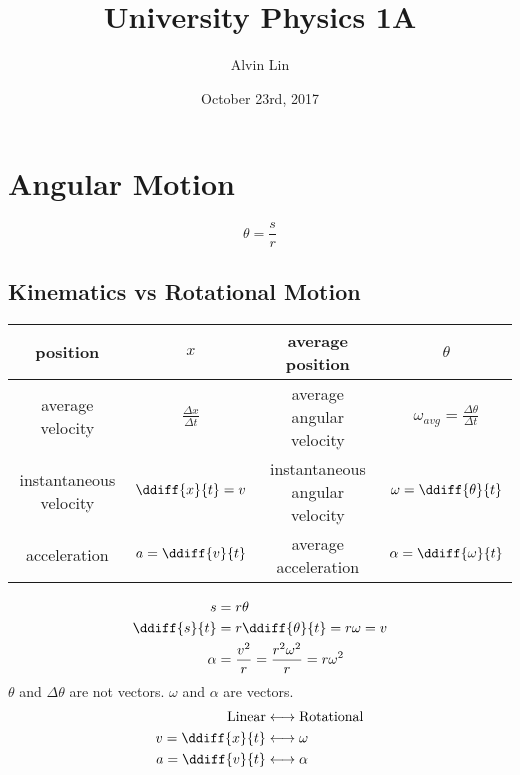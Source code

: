\documentclass{math}
\title{University Physics 1A}
\author{Alvin Lin}
\date{October 23rd, 2017}
\begin{document}
\maketitle

\section*{Angular Motion}

\begin{center}
\end{center}
\[ \theta = \frac{s}{r} \]

\subsection*{Kinematics vs Rotational Motion}
\begin{center}
  \renewcommand{\arraystretch}{1.5}
  \begin{tabular}{|c|c|c|c|}
    \hline
    position & \( x \) & average position & \( \theta \) \\
    \hline
    average velocity & \( \frac{\Delta x}{\Delta t} \) &
      average angular velocity &
      \( \omega_{avg} = \frac{\Delta\theta}{\Delta t} \) \\
    \hline
    instantaneous velocity & \( \ddiff{x}{t} = v \) &
      instantaneous angular velocity & \( \omega = \ddiff{\theta}{t} \) \\
    \hline
    acceleration & \( a = \ddiff{v}{t} \) & average acceleration &
      \( \alpha = \ddiff{\omega}{t} \) \\
    \hline
  \end{tabular}
\end{center}
\begin{align*}
  s &= r\theta \\
  \ddiff{s}{t} &= r\ddiff{\theta}{t} = r\omega = v \\
  \alpha &= \frac{v^2}{r} = \frac{r^2\omega^2}{r} = r\omega^2
\end{align*}
\( \theta \) and \( \Delta\theta \) are not vectors. \( \omega \) and
\( \alpha \) are vectors.
\begin{align*}
  \text{Linear} &\longleftrightarrow \text{Rotational} \\
  v = \ddiff{x}{t} &\longleftrightarrow \omega \\
  a = \ddiff{v}{t} &\longleftrightarrow \alpha
\end{align*}
\end{document}
